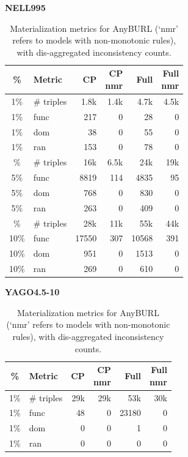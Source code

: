\documentclass[a4paper,UKenglish,cleveref, autoref, thm-restate]{tgdk-v2021}
\begin{document}
\begin{table}[]
\centering
\scriptsize
\setlength{\tabcolsep}{3pt}
\renewcommand{\arraystretch}{1.12}
\caption{Materialization metrics for AnyBURL (`nmr' refers to models with non-monotonic rules), with dis-aggregated inconsistency counts.}
\label{tab:mat_anyburl_10_30_notot_time}
\begin{minipage}[t]{0.49\linewidth}
\centering
\textbf{NELL995}\\
\begin{tabular}{c l | r r r r}
\toprule
\% & Metric & CP & \shortstack{CP\\nmr} & Full & \shortstack{Full\\nmr} \\
\midrule
1\% & \# triples & 1.8k & 1.4k & 4.7k & 4.5k \\
1\% & func & 217 & 0 & 28 & 0 \\
1\% & dom & 38 & 0 & 55 & 0 \\
1\% & ran & 153 & 0 & 78 & 0 \\
\addlinespace
5\% & \# triples & 16k & 6.5k & 24k & 19k \\
5\% & func & 8819 & 114 & 4835 & 95 \\
5\% & dom & 768 & 0 & 830 & 0 \\
5\% & ran & 263 & 0 & 409 & 0 \\
\addlinespace
10\% & \# triples & 28k & 11k & 55k & 44k \\
10\% & func & 17550 & 307 & 10568 & 391 \\
10\% & dom & 951 & 0 & 1513 & 0 \\
10\% & ran & 269 & 0 & 610 & 0 \\
\bottomrule
\end{tabular}
\end{minipage}%
\hfill
\begin{minipage}[t]{0.49\linewidth}
\centering
\textbf{YAGO4.5-10}\\
\begin{tabular}{c l | r r r r}
\toprule
\% & Metric & CP & \shortstack{CP\\nmr} & Full & \shortstack{Full\\nmr} \\
\midrule
1\% & \# triples & 29k & 29k & 53k & 30k \\
1\% & func & 48 & 0 & 23180 & 0 \\
1\% & dom & 0 & 0 & 1 & 0 \\
1\% & ran & 0 & 0 & 0 & 0 \\

\end{tabular}
\end{minipage}
\end{table}
\end{document}
